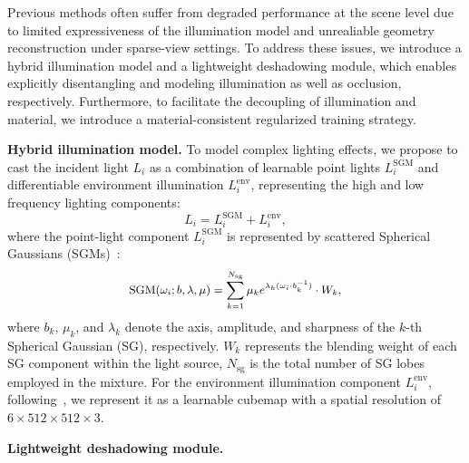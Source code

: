 Previous methods often suffer from degraded performance at the scene level due to limited expressiveness of the illumination model and unrealiable geometry reconstruction under sparse-view settings. To address these issues, we introduce a hybrid illumination model and a lightweight deshadowing module, which enables explicitly disentangling and modeling illumination as well as occlusion, respectively. Furthermore, to facilitate the decoupling of illumination and material, we introduce a material-consistent regularized training strategy.

\vspace{0.5em}
\noindent\textbf{Hybrid illumination model.}
To model complex lighting effects, we propose to cast the incident light $L_i$ as a combination of learnable point lights $L_i^{\text{SGM}}$ and differentiable environment illumination $L_i^{\text{env}}$, representing the high and low frequency lighting components:
\begin{equation}
L_i = L_i^{\text{SGM}} + L_i^{\text{env}},
\end{equation}
where the point-light component $L_i^{\text{SGM}}$ is represented by scattered Spherical Gaussians (SGMs)~\cite{du2024gs}:
\begin{equation}
\small
\begin{aligned}
\text{SGM}(\omega_i; b, \lambda, \mu) =
\sum_{k=1}^{N_{\text{sg}}} \mu_k e^{\lambda_k (\omega_i \cdot b_k^{-1})} \cdot W_k,
\end{aligned}
\end{equation}
where $b_k$, $\mu_k$, and $\lambda_k$ denote the axis, amplitude, and sharpness of the $k$-th Spherical Gaussian (SG), respectively. $W_k$ represents the blending weight of each SG component within the light source, $N_{\text{sg}}$ is the total number of SG lobes employed in the mixture. For the environment illumination component $L_i^{\text{env}}$, following~\cite{liang2024gs}, we represent it as a learnable cubemap with a spatial resolution of $6 \times 512 \times 512 \times 3$.




\vspace{0.5em}
\noindent \textbf{Lightweight deshadowing module.}

